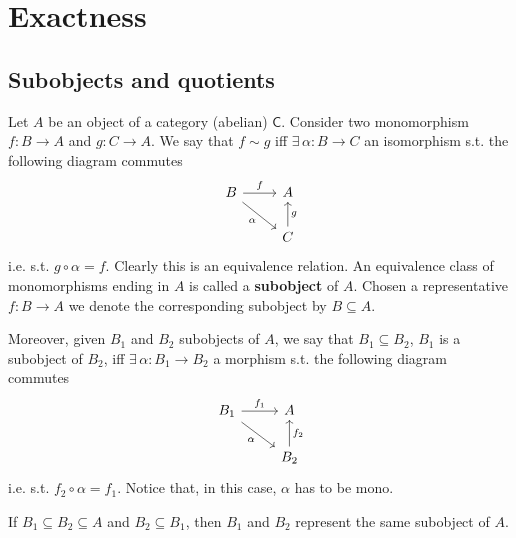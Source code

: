 \section{Exactness}
\subsection{Subobjects and quotients}
\begin{defn}[Subobject]
	Let $A$ be an object of a category (abelian) $\mathsf{C}$.
	Consider two monomorphism $f: B \to A$ and $g: C \to A$.
	We say that $f \sim g$ iff 
	$\exists\, \alpha: B \to C$ an isomorphism s.t. the following diagram commutes
	\begin{equation}
	\begin{tikzcd}
		B \arrow[r, "f", rightarrow] \arrow[rd, "\alpha"', rightarrow] &
		A\\
		&
		C \arrow[u, "g"', rightarrow] 
	\end{tikzcd}
	\end{equation} 
	i.e. s.t. $g \circ \alpha = f$.
	Clearly this is an equivalence relation.
	An equivalence class of monomorphisms ending in $A$ is called a \textbf{subobject} of $A$.
	Chosen a representative $f: B \to A$ we denote the corresponding subobject by $B \subseteq A$.

	Moreover, given $B_1$ and $B_2$ subobjects of $A$, we say that $B_1 \subseteq B_2$, $B_1$ is a subobject of $B_2$, iff
	$\exists\, \alpha: B_1 \to B_2$ a morphism s.t. the following diagram commutes
	\begin{equation}
	\begin{tikzcd}
		B_1 \arrow[r, "f_1", rightarrow] \arrow[rd, "\alpha"', rightarrow] &
		A\\
		&
		B_2 \arrow[u, "f_2"', rightarrow] 
	\end{tikzcd}
	\end{equation} 
	i.e. s.t. $f_2 \circ \alpha = f_1$.
	Notice that, in this case, $\alpha$ has to be mono.
\end{defn}

\begin{rem}
	If $B_1 \subseteq B_2 \subseteq A$ and $B_2 \subseteq B_1$, then $B_1$ and $B_2$ represent the same subobject of $A$.
\end{rem}

